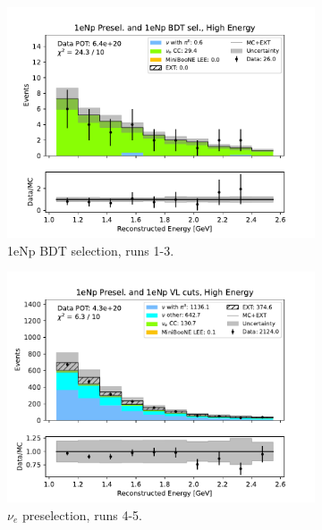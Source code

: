 \begin{figure}[H]
\begin{subfigure}{0.33\linewidth}
    \includegraphics[width=\linewidth]{technote/Sidebands/Figures/FarSideband/far_sideband_reco_e_run123_NP_NPBDT_HIGH_ENERGY.pdf}
    \caption{1eNp BDT selection, runs 1-3.}
    \end{subfigure}
    \begin{subfigure}{0.33\linewidth}
    \includegraphics[width=\linewidth]{technote/Sidebands/Figures/FarSideband/far_sideband_reco_e_run4b4c4d5_NP_NP_HIGH_ENERGY.pdf}
    \caption{$\nu_e$ preselection, runs 4-5.}
    \end{subfigure}%
    \begin{subfigure}{0.33\linewidth}

\end{subfigure}
\end{figure}
